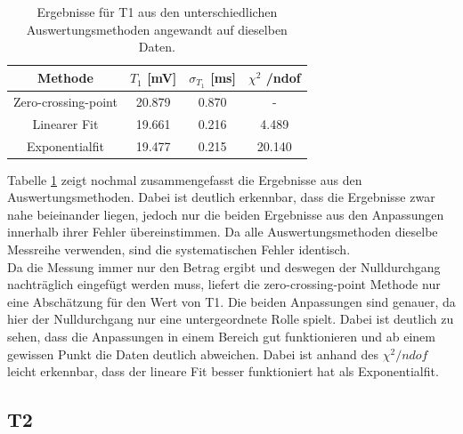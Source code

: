\documentclass[12pt,a4paper]{article}
\begin{document}
\begin{table}
\centering
\begin{tabular}{|c|c|c|c|}
\hline 
Methode & $T_1$ [mV] & $\sigma _{T_1}$ [ms] & $\chi ^2$ /ndof \\ 
\hline 
Zero-crossing-point & 20.879 & 0.870 & - \\ 
\hline 
Linearer Fit & 19.661 & 0.216 & 4.489 \\ 
\hline 
Exponentialfit & 19.477 & 0.215 & 20.140 \\ 
\hline 
\end{tabular} 
\caption{Ergebnisse für T1 aus den unterschiedlichen Auswertungsmethoden angewandt auf dieselben Daten.}
\label{tab:T1_Ergebnisse}
\end{table}

Tabelle \ref{tab:T1_Ergebnisse} zeigt nochmal zusammengefasst die Ergebnisse aus den Auswertungsmethoden. Dabei ist deutlich erkennbar, dass die Ergebnisse zwar nahe beieinander liegen, jedoch nur die beiden Ergebnisse aus den Anpassungen innerhalb ihrer Fehler übereinstimmen. Da alle Auswertungsmethoden dieselbe Messreihe verwenden, sind die systematischen Fehler identisch.\\
Da die Messung immer nur den Betrag ergibt und deswegen der Nulldurchgang nachträglich eingefügt werden muss, liefert die zero-crossing-point Methode nur eine Abschätzung für den Wert von T1. Die beiden Anpassungen sind genauer, da hier der Nulldurchgang nur eine untergeordnete Rolle spielt. Dabei ist deutlich zu sehen, dass die Anpassungen in einem Bereich gut funktionieren und ab einem gewissen Punkt die Daten deutlich abweichen. Dabei ist anhand des $\chi ^2 /ndof$ leicht erkennbar, dass der lineare Fit besser funktioniert hat als Exponentialfit.


\subsection{T2}
\end{document}
